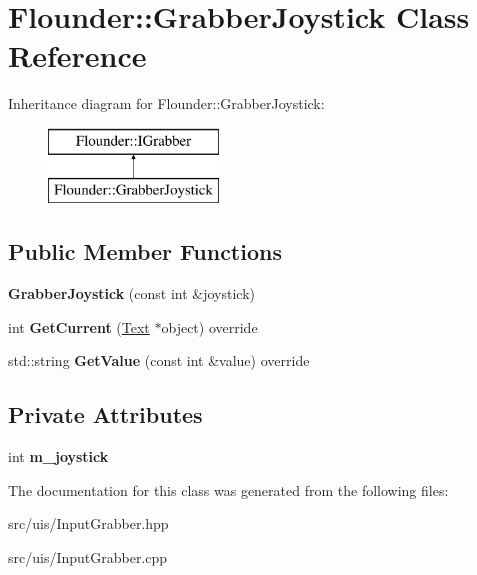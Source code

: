 \hypertarget{class_flounder_1_1_grabber_joystick}{}\section{Flounder\+:\+:Grabber\+Joystick Class Reference}
\label{class_flounder_1_1_grabber_joystick}
Inheritance diagram for Flounder\+:\+:Grabber\+Joystick\+:\begin{figure}[H]
\begin{center}
\leavevmode
\includegraphics[height=2.000000cm]{class_flounder_1_1_grabber_joystick}
\end{center}
\end{figure}
\subsection*{Public Member Functions}
\begin{DoxyCompactItemize}
\item 
\mbox{\label{class_flounder_1_1_grabber_joystick_aadf0f2ef5ce782fb64f9210ad91caf35}} 
{\bfseries Grabber\+Joystick} (const int \&joystick)
\item 
\mbox{\label{class_flounder_1_1_grabber_joystick_aee3d5dba0391ae518472e58250b18f5d}} 
int {\bfseries Get\+Current} (\hyperlink{class_flounder_1_1_text}{Text} $\ast$object) override
\item 
\mbox{\label{class_flounder_1_1_grabber_joystick_a30360056d59dc6dd326dbd6e09d4e5c2}} 
std\+::string {\bfseries Get\+Value} (const int \&value) override
\end{DoxyCompactItemize}
\subsection*{Private Attributes}
\begin{DoxyCompactItemize}
\item 
\mbox{\label{class_flounder_1_1_grabber_joystick_a9c1a7de5b3056c0e65e5803865cda989}} 
int {\bfseries m\+\_\+joystick}
\end{DoxyCompactItemize}


The documentation for this class was generated from the following files\+:\begin{DoxyCompactItemize}
\item 
src/uis/Input\+Grabber.\+hpp\item 
src/uis/Input\+Grabber.\+cpp\end{DoxyCompactItemize}
